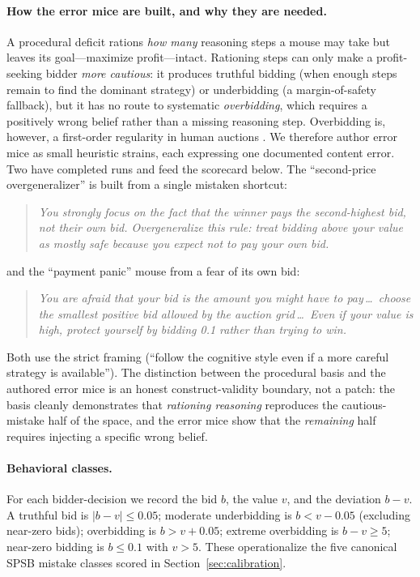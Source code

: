 \documentclass[12pt]{article}
\begin{document}
\paragraph{How the error mice are built, and why they are needed.} A procedural
deficit rations \emph{how many} reasoning steps a mouse may take but leaves its
goal---maximize profit---intact. Rationing steps can only make a profit-seeking
bidder \emph{more cautious}: it produces truthful bidding (when enough steps remain
to find the dominant strategy) or underbidding (a margin-of-safety fallback), but
it has no route to systematic \emph{overbidding}, which requires a positively wrong
belief rather than a missing reasoning step. Overbidding is, however, a first-order
regularity in human auctions \citep{kagellevin1993}. We therefore author error
mice as small heuristic strains, each expressing one documented content error.
Two have completed runs and feed the scorecard below. The
``second-price overgeneralizer'' is built from a single mistaken shortcut:
\begin{quote}\small\itshape
You strongly focus on the fact that the winner pays the second-highest bid, not
their own bid. Overgeneralize this rule: treat bidding above your value as mostly
safe because you expect not to pay your own bid.
\end{quote}
and the ``payment panic'' mouse from a fear of its own bid:
\begin{quote}\small\itshape
You are afraid that your bid is the amount you might have to pay\,\dots\ choose the
smallest positive bid allowed by the auction grid\,\dots\ Even if your value is
high, protect yourself by bidding 0.1 rather than trying to win.
\end{quote}
Both use the strict framing (``follow the cognitive style even if a more careful
strategy is available''). The distinction between the procedural basis and the
authored error mice is an honest construct-validity boundary, not a patch: the
basis cleanly demonstrates that \emph{rationing reasoning} reproduces the
cautious-mistake half of the space, and the error mice show that the
\emph{remaining} half requires injecting a specific wrong belief.

\paragraph{Behavioral classes.} For each bidder-decision we record the bid $b$,
the value $v$, and the deviation $b-v$. A truthful bid is $|b-v|\le 0.05$; moderate
underbidding is $b<v-0.05$ (excluding near-zero bids); overbidding is $b>v+0.05$;
extreme overbidding is $b-v\ge 5$; near-zero bidding is $b\le 0.1$ with $v>5$.
These operationalize the five canonical SPSB mistake classes scored in
Section~\ref{sec:calibration}.
\end{document}

